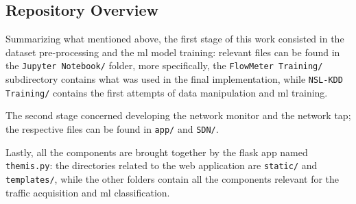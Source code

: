 




\newpage

\subsection{Repository Overview}
\label{subsec:repository}

Summarizing what mentioned above, the first stage of this work consisted in the dataset pre-processing and the \gls{ml} model training: relevant files can be found in the \texttt{Jupyter Notebook/} folder, more specifically, the \texttt{FlowMeter Training/} subdirectory contains what was used in the final implementation, while \texttt{NSL-KDD Training/} contains the first attempts of data manipulation and \gls{ml} training.
\par The second stage concerned developing the network monitor and the network \gls{tap}; the respective files can be found in \texttt{app/} and \texttt{SDN/}.
\par Lastly, all the components are brought together by the flask app named \texttt{themis.py}: the directories related to the web application are \texttt{static/} and \texttt{templates/}, while the other folders contain all the components relevant for the traffic acquisition and \gls{ml} classification. 

